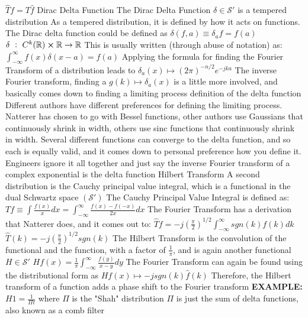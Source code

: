 \documentclass[14pt]{extarticle}
\begin{document}
\begin{outline}
					\3	$\hat{T}f = T\hat{f}$
			\1	Dirac Delta Function
				\2	The Dirac Delta Function $\delta \in \mathscr{S}'$ is a tempered distribution
				\2	As a tempered distribution, it is defined by how it acts on functions.
						The Dirac delta function could be defined as
						$\delta(f,a) \equiv \delta_af = f(a)$
						\3	$\delta~:~C^k(\mathbb{R}) \cross \mathbb{R} \rightarrow \mathbb{R}$
				\2	This is usually written (through abuse of notation) as:
						$\int_{-\infty}^{\infty} f(x) \delta(x - a) = f(a)$
				\2	Applying the formula for finding the Fourier Transform of a distribution
						leads to $\delta_a(x) \mapsto (2\pi)^{-n/2}e^{-jka}$
				\2	The inverse Fourier transform, finding a $g(k) \mapsto \delta_a(x)$
						is a little more involved, and basically comes down to finding a
						limiting process definition of the delta function
						\3	Different authors have different preferences for defining the
								limiting process.  Natterer has chosen to go with Bessel functions,
								other authors use Gaussians that continuously shrink in width,
								others use sinc functions that continuously shrink in width.
						\3	Several different functions can converge to the delta function,
								and so each is equally valid, and it comes down to personal
								preference how you define it.  Engineers ignore it all together
								and just say the inverse Fourier transform of a complex exponential
								is the delta function
			\1	Hilbert Transform
				\2	A second distribution is the Cauchy principal value integral, which
						is a functional in the dual Schwartz space $(\mathscr{S}')$
				\2	The Cauchy Principal Value Integral is defined as:
					\3	$Tf \equiv \int \frac{f(x)}{x} dx = \int_{-\infty}^{\infty} \frac{f(x) - f(-x)}{2x}dx$
				\2	The Fourier Transform has a derivation that Natterer does, and it
						comes out to:
					\3	$\hat{T}f = -j (\frac{\pi}{2})^{1/2} \int_{-\infty}^{\infty} sgn(k) f(k) dk$
					\3	$\hat{T}(k) = -j (\frac{\pi}{2})^{1/2}sgn(k)$
				\2	The Hilbert Transform is the convolution of the functional and the
						function, with a factor of $\frac{1}{\pi}$, and is again another
						functional $H \in \mathscr{S}'$
					\3	$Hf(x) = \frac{1}{\pi}\int_{-\infty}^{\infty} \frac{f(y)}{x-y}dy$
				\2	The Fourier Transform can again be found using the distributional form as
					\3	$Hf(x) \mapsto -j sgn(k) \hat{f}(k)$
					\3	Therefore, the Hilbert transform of a function adds a phase shift
							to the Fourier transform
				\2	\textbf{EXAMPLE:}
					\3	$H 1 = \frac{1}{\Pi t}$ where $\Pi$ is the "Shah" distribution
						\4	$\Pi$ is just the sum of delta functions, also known as a comb filter

\end{outline}
\end{document}
